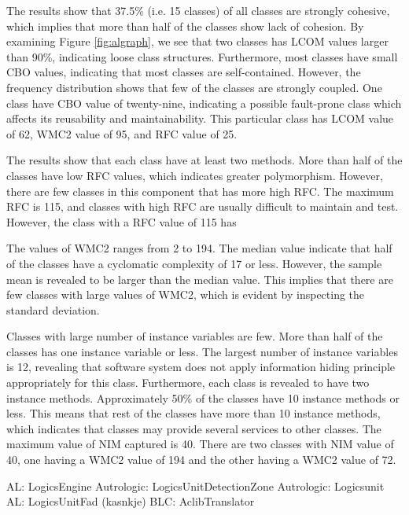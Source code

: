The results show that 37.5\% (i.e. 15 classes) of all classes are strongly cohesive, which implies that more than half of the classes show lack of cohesion. By examining Figure \ref{fig:algraph}, we see that two classes has LCOM values larger than 90\%, indicating loose class structures. Furthermore, most classes have small CBO values, indicating that most classes are self-contained. However, the frequency distribution shows that few of the classes are strongly coupled. One class have CBO value of twenty-nine, indicating a possible fault-prone class which affects its reusability and maintainability. This particular class has LCOM value of 62, WMC2 value of 95, and RFC value of 25.

The results show that each class have at least two methods. More than half of the classes have low RFC values, which indicates greater polymorphism. However, there are few classes in this component that has more high RFC. The maximum RFC is 115, and classes with high RFC are usually difficult to maintain and test. However, the class with a RFC value of 115 has 

The values of WMC2 ranges from 2 to 194. The median value indicate that half of the classes have a cyclomatic complexity of 17 or less. However, the sample mean is revealed to be larger than the median value. This implies that there are few classes with large values of WMC2, which is evident by inspecting the standard deviation.

Classes with large number of instance variables are few. More than half of the classes has one instance variable or less. The largest number of instance variables is 12, revealing that software system does not apply information hiding principle appropriately for this class. Furthermore, each class is revealed to have two instance methods. Approximately 50\% of the classes have 10 instance methods or less. This means that rest of the classes have more than 10 instance methods, which indicates that classes may provide several services to other classes. The maximum value of NIM captured is 40. There are two classes with NIM value of 40, one having a WMC2 value of 194 and the other having a WMC2 value of 72. 


AL: LogicsEngine
Autrologic: LogicsUnitDetectionZone
Autrologic: Logicsunit
AL: LogicsUnitFad (kasnkje)
BLC: AclibTranslator


